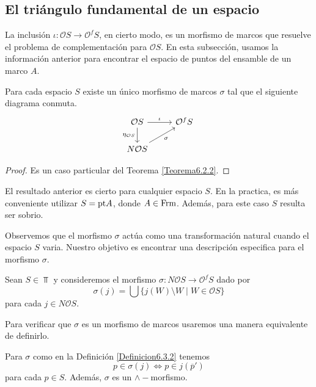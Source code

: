 \subsection{El triángulo fundamental de un espacio}

La inclusión $\iota\colon \mathcal{O}S\to \mathcal{O}^fS$, en cierto modo, es un morfismo de marcos que resuelve el problema de complementación para $\mathcal{O}S$. En esta subsección, usamos la información anterior para encontrar el espacio de puntos del ensamble de un marco $A$.

\begin{lem}\label{Lema6.3.1}
    Para cada espacio $S$ existe un único morfismo de marcos $\sigma$ tal que el siguiente diagrama conmuta.
\[\begin{tikzcd}
	{\mathcal{O}S} & {\mathcal{O} ^fS} \\
	{N\mathcal{O}S}
	\arrow["\iota", from=1-1, to=1-2]
	\arrow["{\eta_{\mathcal{O}S}}"', from=1-1, to=2-1]
	\arrow["\sigma"', from=2-1, to=1-2]
\end{tikzcd}\]
\end{lem}

\begin{proof}
    Es un caso particular del Teorema \ref{Teorema6.2.2}.
\end{proof}

El resultado anterior es cierto para cualquier espacio $S$. En la practica, es más conveniente utilizar $S=\mathrm{pt} A$, donde $A\in \mathrm{Frm}$. Además, para este caso $S$ resulta ser sobrio.

Observemos que el morfismo $\sigma$ actúa como una transformación natural cuando el espacio $S$ varia. Nuestro objetivo es encontrar una descripción especifica para el morfismo $\sigma$.

\begin{dfn}\label{Definicion6.3.2}
    Sean $S\in \Top$ y consideremos el morfismo $\sigma\colon N\mathcal{O}S\to \mathcal{O}^fS$ dado por 
    \[
    \sigma(j)=\bigcup\{j(W)\setminus W\mid W\in \mathcal{O}S\}
    \]
    para cada $j\in N\mathcal{O}S$.
\end{dfn}

Para verificar que $\sigma$ es un morfismo de marcos usaremos una manera equivalente de definirlo.

\begin{lem}\label{Lema6.3.3}
    Para $\sigma$ como en la Definición \ref{Definicion6.3.2} tenemos 
    \[
    p\in \sigma(j)\Leftrightarrow p\in j(\overline{p}')
    \]
    para cada $p\in S$. Además, $\sigma$ es un $\wedge-$morfismo.
\end{lem}

